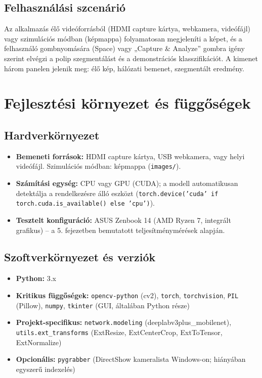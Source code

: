 \documentclass[12pt, a4paper]{report}
\begin{document}
\subsection{Felhasználási szcenárió}
Az alkalmazás élő videóforrásból (HDMI capture kártya, webkamera, videófájl) vagy szimulációs módban (képmappa) folyamatosan megjeleníti a képet, és a felhasználó gombnyomására (Space) vagy „Capture \& Analyze” gombra igény szerint elvégzi a polip szegmentálást és a demonstrációs klasszifikációt. A kimenet három panelen jelenik meg: élő kép, hálózati bemenet, szegmentált eredmény.

\section{Fejlesztési környezet és függőségek}

\subsection{Hardverkörnyezet}
\begin{itemize}
    \item \textbf{Bemeneti források:} HDMI capture kártya, USB webkamera, vagy helyi videófájl. Szimulációs módban: képmappa (\texttt{images/}).
    \item \textbf{Számítási egység:} CPU vagy GPU (CUDA); a modell automatikusan detektálja a rendelkezésre álló eszközt (\texttt{torch.device('cuda' if torch.cuda.is\_available() else 'cpu')}).
    \item \textbf{Tesztelt konfiguráció:} ASUS Zenbook 14 (AMD Ryzen 7, integrált grafikus) – a 5. fejezetben bemutatott teljesítménymérések alapján.
\end{itemize}

\subsection{Szoftverkörnyezet és verziók}
\begin{itemize}
    \item \textbf{Python:} 3.x
    \item \textbf{Kritikus függőségek:} \texttt{opencv-python} (cv2), \texttt{torch}, \texttt{torchvision}, \texttt{PIL} (Pillow), \texttt{numpy}, \texttt{tkinter} (GUI, általában Python része)
    \item \textbf{Projekt-specifikus:} \texttt{network.modeling} (deeplabv3plus\_mobilenet), \texttt{utils.ext\_transforms} (ExtResize, ExtCenterCrop, ExtToTensor, ExtNormalize)
    \item \textbf{Opcionális:} \texttt{pygrabber} (DirectShow kameralista Windows-on; hiányában egyszerű indexelés)
\end{itemize}
\end{document}

